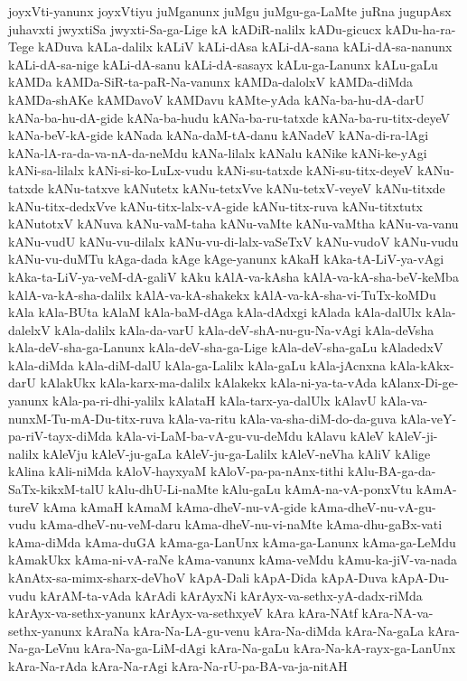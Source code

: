 {joyxVti-yanunx
joyxVtiyu
juMganunx
juMgu
juMgu-ga-LaMte
juRna
jugupAsx
juhavxti
jwyxtiSa
jwyxti-Sa-ga-Lige
kA
kADiR-nalilx
kADu-gicucx
kADu-ha-ra-Tege
kADuva
kALa-dalilx
kALiV
kALi-dAsa
kALi-dA-sana
kALi-dA-sa-nanunx
kALi-dA-sa-nige
kALi-dA-sanu
kALi-dA-sasayx
kALu-ga-Lanunx
kALu-gaLu
kAMDa
kAMDa-SiR-ta-paR-Na-vanunx
kAMDa-dalolxV
kAMDa-diMda
kAMDa-shAKe
kAMDavoV
kAMDavu
kAMte-yAda
kANa-ba-hu-dA-darU
kANa-ba-hu-dA-gide
kANa-ba-hudu
kANa-ba-ru-tatxde
kANa-ba-ru-titx-deyeV
kANa-beV-kA-gide
kANada
kANa-daM-tA-danu
kANadeV
kANa-di-ra-lAgi
kANa-lA-ra-da-va-nA-da-neMdu
kANa-lilalx
kANalu
kANike
kANi-ke-yAgi
kANi-sa-lilalx
kANi-si-ko-LuLx-vudu
kANi-su-tatxde
kANi-su-titx-deyeV
kANu-tatxde
kANu-tatxve
kANutetx
kANu-tetxVve
kANu-tetxV-veyeV
kANu-titxde
kANu-titx-dedxVve
kANu-titx-lalx-vA-gide
kANu-titx-ruva
kANu-titxtutx
kANutotxV
kANuva
kANu-vaM-taha
kANu-vaMte
kANu-vaMtha
kANu-va-vanu
kANu-vudU
kANu-vu-dilalx
kANu-vu-di-lalx-vaSeTxV
kANu-vudoV
kANu-vudu
kANu-vu-duMTu
kAga-dada
kAge
kAge-yanunx
kAkaH
kAka-tA-LiV-ya-vAgi
kAka-ta-LiV-ya-veM-dA-galiV
kAku
kAlA-va-kAsha
kAlA-va-kA-sha-beV-keMba
kAlA-va-kA-sha-dalilx
kAlA-va-kA-shakekx
kAlA-va-kA-sha-vi-TuTx-koMDu
kAla
kAla-BUta
kAlaM
kAla-baM-dAga
kAla-dAdxgi
kAlada
kAla-dalUlx
kAla-dalelxV
kAla-dalilx
kAla-da-varU
kAla-deV-shA-nu-gu-Na-vAgi
kAla-deVsha
kAla-deV-sha-ga-Lanunx
kAla-deV-sha-ga-Lige
kAla-deV-sha-gaLu
kAladedxV
kAla-diMda
kAla-diM-dalU
kAla-ga-Lalilx
kAla-gaLu
kAla-jAcnxna
kAla-kAkx-darU
kAlakUkx
kAla-karx-ma-dalilx
kAlakekx
kAla-ni-ya-ta-vAda
kAlanx-Di-ge-yanunx
kAla-pa-ri-dhi-yalilx
kAlataH
kAla-tarx-ya-dalUlx
kAlavU
kAla-va-nunxM-Tu-mA-Du-titx-ruva
kAla-va-ritu
kAla-va-sha-diM-do-da-guva
kAla-veY-pa-riV-tayx-diMda
kAla-vi-LaM-ba-vA-gu-vu-deMdu
kAlavu
kAleV
kAleV-ji-nalilx
kAleVju
kAleV-ju-gaLa
kAleV-ju-ga-Lalilx
kAleV-neVha
kAliV
kAlige
kAlina
kAli-niMda
kAloV-hayxyaM
kAloV-pa-pa-nAnx-tithi
kAlu-BA-ga-da-SaTx-kikxM-talU
kAlu-dhU-Li-naMte
kAlu-gaLu
kAmA-na-vA-ponxVtu
kAmA-tureV
kAma
kAmaH
kAmaM
kAma-dheV-nu-vA-gide
kAma-dheV-nu-vA-gu-vudu
kAma-dheV-nu-veM-daru
kAma-dheV-nu-vi-naMte
kAma-dhu-gaBx-vati
kAma-diMda
kAma-duGA
kAma-ga-LanUnx
kAma-ga-Lanunx
kAma-ga-LeMdu
kAmakUkx
kAma-ni-vA-raNe
kAma-vanunx
kAma-veMdu
kAmu-ka-jiV-va-nada
kAnAtx-sa-mimx-sharx-deVhoV
kApA-Dali
kApA-Dida
kApA-Duva
kApA-Du-vudu
kArAM-ta-vAda
kArAdi
kArAyxNi
kArAyx-va-sethx-yA-dadx-riMda
kArAyx-va-sethx-yanunx
kArAyx-va-sethxyeV
kAra
kAra-NAtf
kAra-NA-va-sethx-yanunx
kAraNa
kAra-Na-LA-gu-venu
kAra-Na-diMda
kAra-Na-gaLa
kAra-Na-ga-LeVnu
kAra-Na-ga-LiM-dAgi
kAra-Na-gaLu
kAra-Na-kA-rayx-ga-LanUnx
kAra-Na-rAda
kAra-Na-rAgi
kAra-Na-rU-pa-BA-va-ja-nitAH
}
